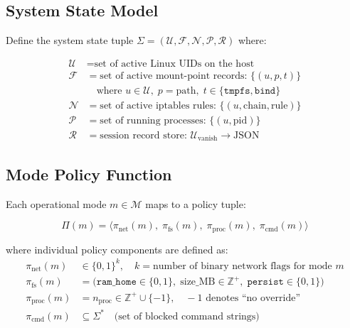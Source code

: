 \subsection{System State Model}

Define the system state tuple $\Sigma = (\mathcal{U}, \mathcal{F}, \mathcal{N}, \mathcal{P}, \mathcal{R})$ where:

\begin{align*}
    \mathcal{U} &= \text{set of active Linux UIDs on the host} \\
    \mathcal{F} &= \text{set of active mount-point records: } \{(u, p, t)\} \\
    &\quad \text{where } u \in \mathcal{U},\; p = \text{path},\; t \in \{\texttt{tmpfs}, \texttt{bind}\} \\
    \mathcal{N} &= \text{set of active iptables rules: } \{(u, \text{chain}, \text{rule})\} \\
    \mathcal{P} &= \text{set of running processes: } \{(u, \text{pid})\} \\
    \mathcal{R} &= \text{session record store: } \mathcal{U}_{\text{vanish}} \to \text{JSON}
\end{align*}

\subsection{Mode Policy Function}

Each operational mode $m \in \mathcal{M}$ maps to a policy tuple:

\begin{equation}
    \Pi(m) = \Big\langle \pi_{\text{net}}(m),\; \pi_{\text{fs}}(m),\; \pi_{\text{proc}}(m),\; \pi_{\text{cmd}}(m) \Big\rangle
    \label{eq:policy_tuple}
\end{equation}

where individual policy components are defined as:
\begin{align}
    \pi_{\text{net}}(m) &\in \{0, 1\}^k, \quad k = \text{number of binary network flags for mode } m \\
    \pi_{\text{fs}}(m)  &= \big(\texttt{ram\_home} \in \{0,1\},\; \text{size\_MB} \in \mathbb{Z}^+,\; \texttt{persist} \in \{0,1\}\big) \\
    \pi_{\text{proc}}(m) &= n_{\text{proc}} \in \mathbb{Z}^+ \cup \{-1\}, \quad -1 \text{ denotes ``no override''} \\
    \pi_{\text{cmd}}(m)  &\subseteq \Sigma^* \quad \text{(set of blocked command strings)}
\end{align}

